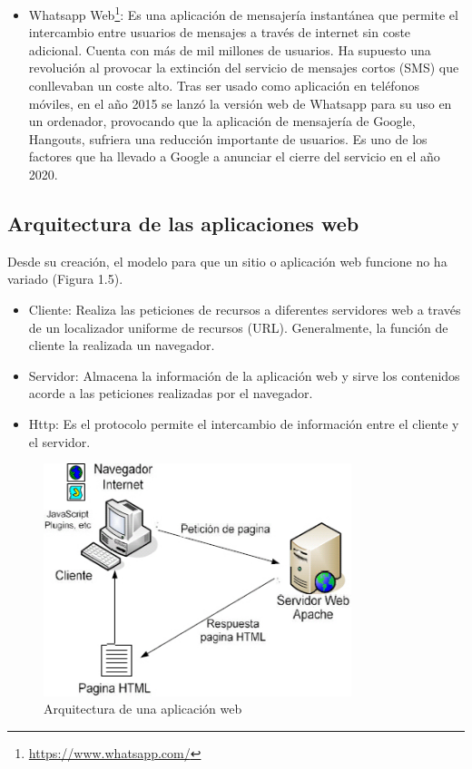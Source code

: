\begin{itemize}
\item Whatsapp Web\footnote{\url{https://www.whatsapp.com/}}: Es una aplicación de mensajería instantánea que permite el intercambio entre usuarios de mensajes a través de internet sin coste adicional. Cuenta con más de mil millones de usuarios. Ha supuesto una revolución al provocar la extinción del servicio de mensajes cortos (SMS) que conllevaban un coste alto. Tras ser usado como aplicación en teléfonos móviles, en el año 2015 se lanzó la versión web de Whatsapp para su uso en un ordenador, provocando que la aplicación de mensajería de Google, Hangouts, sufriera una reducción importante de usuarios. Es uno de los factores que ha llevado a Google a anunciar el cierre del servicio en el año 2020.
\end{itemize}

\subsection{Arquitectura de las aplicaciones web}
Desde su creación, el modelo para que un sitio o aplicación web funcione no ha variado (Figura 1.5).
\begin{itemize}
	\item Cliente: Realiza las peticiones de recursos a diferentes servidores web a través de un localizador uniforme de recursos (URL). Generalmente, la función de cliente la realizada un navegador.
	\item Servidor: Almacena la información de la aplicación web y sirve los contenidos acorde a las peticiones realizadas por el navegador.
	\item Http: Es el protocolo permite el intercambio de información entre el cliente y el servidor.
\end{itemize}
\begin{figure}[H]
  \begin{center}
    \includegraphics[width=0.8\textwidth]{figures/arquitecturaweb.jpg}
		\caption{Arquitectura de una aplicación web}
		\label{fig.arquitecturaweb}
		\end{center}
\end{figure}

